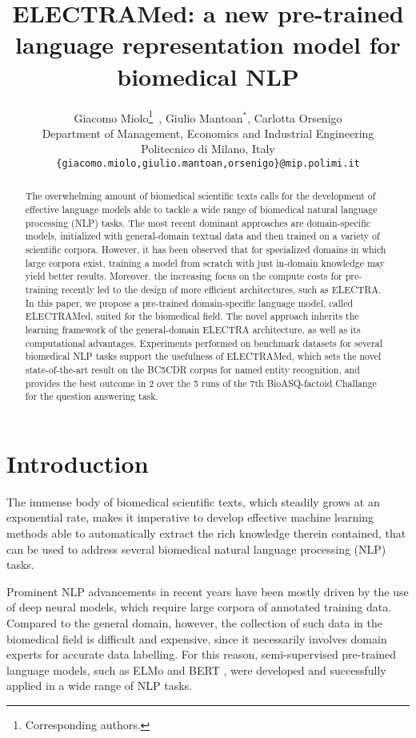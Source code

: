 \documentclass{article}
\title{ELECTRAMed: a new pre-trained language representation model for biomedical NLP}
\author{
Giacomo Miolo\thanks{Corresponding authors.}\,\,\,, Giulio Mantoan$^\ast$, Carlotta Orsenigo \\
Department of Management, Economics and Industrial Engineering \\
Politecnico di Milano, Italy \\
\texttt{\{giacomo.miolo,giulio.mantoan,orsenigo\}@mip.polimi.it} \\
}
\begin{document}
\maketitle

\begin{abstract}
The overwhelming amount of biomedical scientific texts calls for the development of effective language models able to tackle a wide range of biomedical natural language processing (NLP) tasks. The most recent dominant approaches are domain-specific models, initialized with general-domain textual data and then trained on a variety of scientific corpora. However, it has been observed that for specialized domains in which large corpora exist, training a model from scratch with just in-domain knowledge may yield better results. Moreover, the increasing focus on the compute costs for pre-training recently led to the design of more efficient architectures, such as ELECTRA. In this paper, we propose a pre-trained domain-specific language model, called ELECTRAMed, suited for the biomedical field. The novel approach inherits the learning framework of the general-domain ELECTRA architecture, as well as its computational advantages. Experiments performed on benchmark datasets for several biomedical NLP tasks support the usefulness of ELECTRAMed, which sets the novel state-of-the-art result on the BC5CDR corpus for named entity recognition, and provides the best outcome in 2 over the 5 runs of the 7th BioASQ-factoid Challange for the question answering task.\\
\end{abstract}




\section{Introduction}
The immense body of biomedical scientific texts, which steadily grows at an exponential rate, makes it imperative to develop effective machine learning methods able to automatically extract the rich knowledge therein contained, that can be used to address several biomedical natural language processing (NLP) tasks.

Prominent NLP advancements in recent years have been mostly driven by the use of deep neural models, which require large corpora of annotated training data. 
Compared to the general domain, however, the collection of such data in the biomedical field is difficult and expensive, since it  necessarily involves domain experts for accurate data labelling.  
For this reason, semi-supervised pre-trained language models, such as ELMo \citep{Peters18} and BERT \citep{Devlin19}, were developed and successfully applied in a wide range of NLP tasks.
\end{document}
